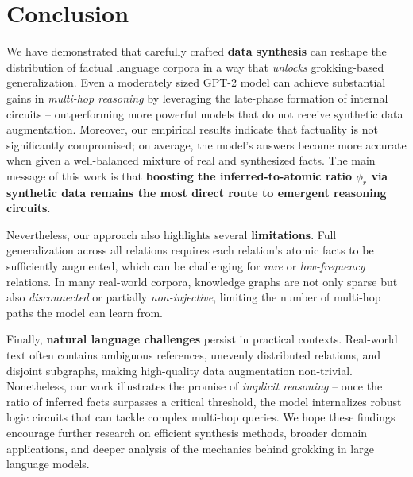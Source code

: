 \section{Conclusion}\label{sec:conclusion}
    
    We have demonstrated that carefully crafted \textbf{data synthesis} can reshape the distribution of factual language corpora in a way that \emph{unlocks} grokking-based generalization. Even a moderately sized GPT-2 model can achieve substantial gains in \emph{multi-hop reasoning} by leveraging the late-phase formation of internal circuits -- outperforming more powerful models that do not receive synthetic data augmentation. Moreover, our empirical results indicate that factuality is not significantly compromised; on average, the model’s answers become more accurate when given a well-balanced mixture of real and synthesized facts. The main message of this work is that \textbf{boosting the inferred-to-atomic ratio $\phi_r$ via synthetic data remains the most direct route to emergent reasoning circuits}.
    
    Nevertheless, our approach also highlights several \textbf{limitations}. Full generalization across all relations requires each relation’s atomic facts to be sufficiently augmented, which can be challenging for \emph{rare} or \emph{low-frequency} relations. In many real-world corpora, knowledge graphs are not only sparse but also \emph{disconnected} or partially \emph{non-injective}, limiting the number of multi-hop paths the model can learn from. 
    
    Finally, \textbf{natural language challenges} persist in practical contexts. Real-world text often contains ambiguous references, unevenly distributed relations, and disjoint subgraphs, making high-quality data augmentation non-trivial. Nonetheless, our work illustrates the promise of \emph{implicit reasoning} -- once the ratio of inferred facts surpasses a critical threshold, the model internalizes robust logic circuits that can tackle complex multi-hop queries. We hope these findings encourage further research on efficient synthesis methods, broader domain applications, and deeper analysis of the mechanics behind grokking in large language models.
     